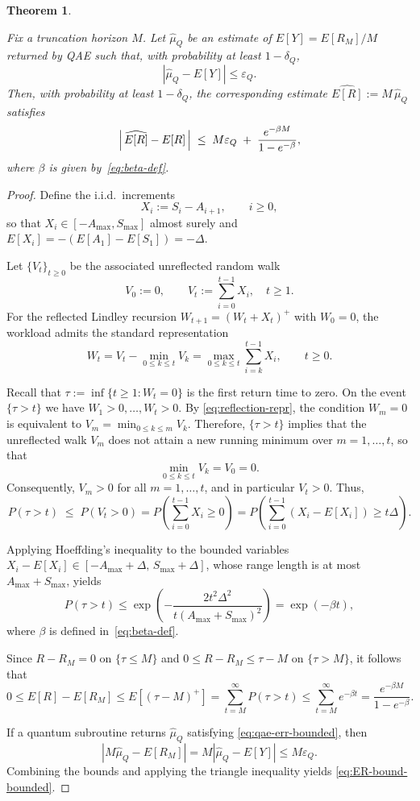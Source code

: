 \documentclass[10pt,a4paper]{amsart}
\newtheorem{theorem}{Theorem}
\begin{document}
\begin{theorem}
\label{thm:ER-error-bounded}

Fix a truncation horizon $M$. Let $\hat{\mu}_Q$
be an estimate of $E[Y]=E[R_M]/M$ returned by QAE
such that, with probability at least $1-\delta_Q$,
\begin{equation}
\label{eq:qae-err-bounded}
|\hat{\mu}_Q - E[Y]|
\le \varepsilon_Q.
\end{equation}
Then, with probability at least $1-\delta_Q$, the corresponding estimate
$\widehat{E[R]} := M\,\hat{\mu}_Q$ satisfies
\begin{equation}
\label{eq:ER-bound-bounded}
\Bigl|\,\widehat{E[R]} - E[R]\,\Bigr|
\;\le\;
M\varepsilon_Q
\;+\;
\frac{e^{-\beta M}}{1-e^{-\beta}},
\end{equation}
where $\beta$ is given by~\eqref{eq:beta-def}.
\end{theorem}

\begin{proof}
Define the i.i.d.\ increments
\[
X_i := S_i - A_{i+1},\qquad i\ge 0,
\]
so that $X_i\in[-A_{\max},S_{\max}]$ almost surely and
$E[X_i]=-(E[A_1]-E[S_1])=-\Delta$.

Let $\{V_t\}_{t\ge 0}$ be the associated unreflected random walk
\[
V_0 := 0,
\qquad
V_t := \sum_{i=0}^{t-1} X_i , \quad t\ge 1.
\]
For the reflected Lindley recursion $W_{t+1}=(W_t+X_t)^+$ with $W_0=0$, the
workload admits the standard representation
\begin{equation}
\label{eq:reflection-repr}
W_t = V_t - \min_{0\le k\le t} V_k
= \max_{0\le k\le t} \sum_{i=k}^{t-1} X_i ,
\qquad t\ge 0.
\end{equation}

Recall that $\tau:=\inf\{t\ge 1 : W_t=0\}$ is the first return time to zero.
On the event $\{\tau>t\}$ we have $W_1>0,\dots,W_t>0$.  By
\eqref{eq:reflection-repr}, the condition $W_m=0$ is equivalent to
$V_m=\min_{0\le k\le m}V_k$.  Therefore, $\{\tau>t\}$ implies that the
unreflected walk $V_m$ does not attain a new running minimum over
$m=1,\dots,t$, so that
\[
\min_{0\le k\le t} V_k = V_0 = 0.
\]
Consequently, $V_m>0$ for all $m=1,\dots,t$, and in particular $V_t>0$.
Thus,
\[
P(\tau>t)
\;\le\;
P(V_t>0)
=
P\!\left(\sum_{i=0}^{t-1} X_i \ge 0\right)
=
P\!\left(\sum_{i=0}^{t-1} (X_i-E[X_i]) \ge t\Delta\right).
\]

Applying Hoeffding's inequality to the bounded variables
$X_i-E[X_i]\in[-A_{\max}+\Delta,\,S_{\max}+\Delta]$, whose range length is at
most $A_{\max}+S_{\max}$, yields
\[
P(\tau>t)
\le
\exp\!\left(
-\frac{2t^2\Delta^2}{t(A_{\max}+S_{\max})^2}
\right)
=
\exp(-\beta t),
\]
where $\beta$ is defined in~\eqref{eq:beta-def}.

Since $R-R_M=0$ on $\{\tau\le M\}$ and $0\le R-R_M\le \tau-M$ on $\{\tau>M\}$,
it follows that
\[
0\le E[R]-E[R_M]
\le E[(\tau-M)^+]
= \sum_{t=M}^{\infty} P(\tau>t)
\le \sum_{t=M}^{\infty} e^{-\beta t}
= \frac{e^{-\beta M}}{1-e^{-\beta}}.
\]

If a quantum subroutine returns $\hat{\mu}_Q$ satisfying
\eqref{eq:qae-err-bounded}, then
\[
|M\hat{\mu}_Q - E[R_M]|
= M|\hat{\mu}_Q - E[Y]|
\le M\varepsilon_Q.
\]
Combining the bounds and applying the triangle inequality yields
\eqref{eq:ER-bound-bounded}.
\end{proof}
\end{document}
